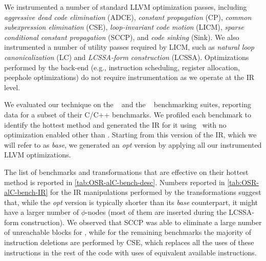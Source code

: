 \noindent We instrumented a number of standard LLVM optimization passes, including {\em aggressive dead code elimination} (ADCE), {\em constant propagation} (CP), {\em common subexpression elimination} (CSE), {\em loop-invariant code motion} (LICM), {\em sparse conditional constant propagation} (SCCP), and {\em code sinking} (Sink). We also instrumented a number of utility passes required by LICM, such as {\em natural loop canonicalization} (LC) and {\em LCSSA-form construction} (LCSSA). Optimizations performed by the back-end (e.g., instruction scheduling, register allocation, peephole optimizations) do not require instrumentation as we operate at the IR level.

We evaluated our technique on the \speccpu~\cite{Henning06} and the \phoronixpts~\cite{Phoronix} benchmarking suites, reporting data for a subset of their C/C++ benchmarks. We profiled each benchmark to identify the hottest method and generated the IR for it using \clang\ with no optimization enabled other than . Starting from this version of the IR, which we will refer to as {\em base}, we generated an {\em opt} version by applying all our instrumented LLVM optimizations. 

The list of benchmarks and transformations that are effective on their hottest method is reported in \mytable\ref{tab:OSR-alC-bench-desc}. Numbers reported in \mytable\ref{tab:OSR-alC-bench-IR} for the IR manipulations performed by the transformations suggest that, while the {\em opt} version is typically shorter than its {\em base} counterpart, it might have a larger number of $\phi$-nodes (most of them are inserted during the LCSSA-form construction). We observed that SCCP was able to eliminate a large number of unreachable blocks for , while for the remaining benchmarks the majority of instruction deletions are performed by CSE, which replaces all the uses of these instructions in the rest of the code with uses of equivalent available instructions. 

